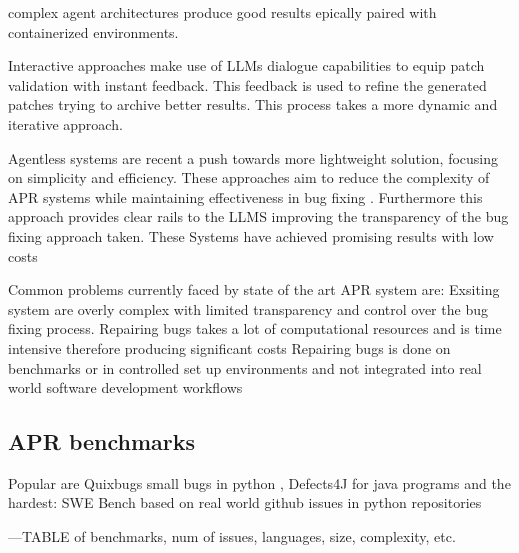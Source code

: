 complex agent architectures produce good results epically paired with containerized environments. \cite{puvvadiCodingAgentsComprehensive2025}

Interactive approaches make use of LLMs dialogue capabilities to equip patch validation with instant feedback. This feedback is used to refine the generated patches trying to archive better results. This process takes a more dynamic and iterative approach. \cite{xiaAutomatedProgramRepair2024}

Agentless systems are recent a push towards more lightweight solution, focusing on simplicity and efficiency. These approaches aim to reduce the complexity of APR systems while maintaining effectiveness in bug fixing \cite{xiaAgentlessDemystifyingLLMbased2024}. Furthermore this approach provides clear rails to the LLMS improving the transparency of the bug fixing approach taken.
These Systems have achieved promising results  with low costs \cite{xiaAgentlessDemystifyingLLMbased2024}



Common problems currently faced by state of the art APR system are:
Exsiting system are overly complex with limited transparency and control over the bug fixing process.\cite{xiaAgentlessDemystifyingLLMbased2024,puvvadiCodingAgentsComprehensive202, houLargeLanguageModels2024}
Repairing bugs takes a lot of computational resources and is time intensive therefore producing significant costs  \cite{sobaniaAnalysisAutomaticBug2023,puvvadiCodingAgentsComprehensive2025}
Repairing bugs is done on benchmarks or in controlled set up environments and not integrated into real world software development workflows \cite{meemExploringExperiencesAutomated2024,puvvadiCodingAgentsComprehensive2025}

\subsection{APR benchmarks}
Popular are Quixbugs small bugs in python , Defects4J for java programs and the hardest: SWE Bench based on real world github issues in python repositories

---TABLE of benchmarks, num of issues, languages, size, complexity, etc.